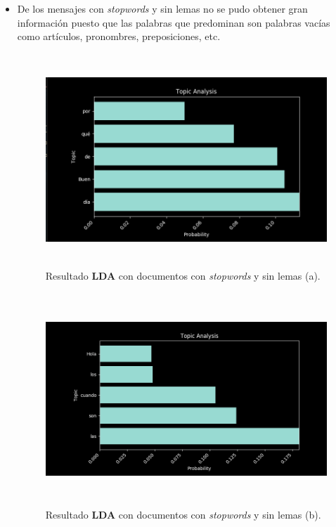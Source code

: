     \begin{itemize}
        \item De los mensajes con \textit{stopwords} y sin lemas no se pudo obtener gran información puesto que las palabras que predominan son palabras vacías como artículos, pronombres, preposiciones, etc.
        \begin{figure}[H]
            \centering
            \includegraphics[height=8cm, width=16.5cm]{Latex/Classes/Imagenes/ws_nl-1.png}
            \caption{Resultado \textbf{LDA} con documentos con \textit{stopwords} y sin lemas (a).}
            \label{fig:ws_nl-1}
        \end{figure}
        \begin{figure}[H]
            \centering
            \includegraphics[height=8cm, width=16.5cm]{Latex/Classes/Imagenes/ws_nl-2.png}
            \caption{Resultado \textbf{LDA} con documentos con \textit{stopwords} y sin lemas (b).}
            \label{fig:ws_nl-2}
        \end{figure}
        \newpage
        

\end{itemize}

